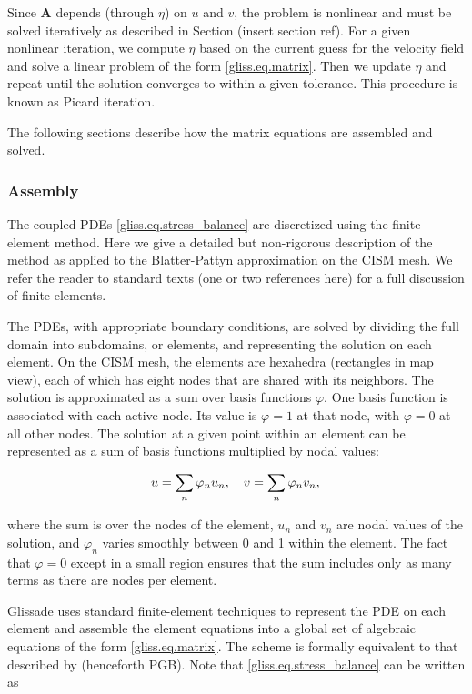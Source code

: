 Since $\mathbf{A}$ depends (through $\eta$) on $u$ and $v$, the problem is nonlinear and must be solved iteratively
as described in Section (insert section ref).  For a given nonlinear iteration, we compute $\eta$ based on the
current guess for the velocity field and solve a linear problem of the form \eqref{gliss.eq.matrix}.
Then we update $\eta$ and repeat until the solution converges to within a given tolerance.  This procedure
is known as Picard iteration.

The following sections describe how the matrix equations are assembled and solved. 

\subsubsection{Assembly}

The coupled PDEs \eqref{gliss.eq.stress_balance} are discretized using the finite-element method.
Here we give a detailed but non-rigorous description of the method as applied to the Blatter-Pattyn
approximation on the CISM mesh.
We refer the reader to standard texts (one or two references here) for a full discussion of finite elements.

The PDEs, with appropriate boundary conditions, are solved by dividing the full domain into 
subdomains, or elements, and representing the solution on each element.
On the CISM mesh, the elements are hexahedra (rectangles
in map view), each of which has eight nodes that are shared with its neighbors.
The solution is approximated as a sum over basis functions $\varphi$. One basis function
is associated with each active node.  Its value is $\varphi = 1$ at that node,
with $\varphi = 0$ at all other nodes. The solution at a given point
within an element can be represented as a sum of basis functions multiplied by nodal values:

\begin{equation}
\label{gliss.eq.velo_expansion}  
   u=\sum\limits_{n}{{{\varphi }_{n}}{{u}_{n}}}, \quad v=\sum\limits_{n}{{{\varphi }_{n}}{{v}_{n}}},  \\
\end{equation}

\noindent
where the sum is over the nodes of the element, $u_n$ and $v_n$ are nodal
values of the solution, and $\varphi_n$ varies smoothly between 0 and 1 within the element.
The fact that $\varphi = 0$ except in a small region ensures that the sum includes only
as many terms as there are nodes per element.

Glissade uses standard finite-element techniques to represent the PDE on each element and assemble
the element equations into a global set of algebraic equations of the form \eqref{gliss.eq.matrix}.
The scheme is formally equivalent to that described by \citet{Perego2012} (henceforth PGB).
Note that \eqref{gliss.eq.stress_balance} can be written as

